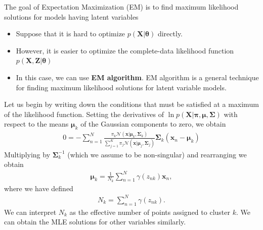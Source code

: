 The goal of Expectation Maximization (EM) is to find maximum likelihood solutions for models having latent variables 
\begin{itemize}
	\item Suppose that it is hard to optimize $p(\mathbf{X}|\boldsymbol{\theta})$ directly.
	\item However, it is easier to optimize the complete-data likelihood function $p(\mathbf{X}, \mathbf{Z}|\boldsymbol{\theta})$ 
	\item In this case, we can use \textbf{EM algorithm}. EM algorithm is a general technique for finding maximum likelihood solutions for latent variable models. 
\end{itemize}
Let us begin by writing down the conditions that must be satisfied at a maximum of the likelihood function. Setting the derivatives of $\ln p(\mathbf{X}|\boldsymbol{\pi},\boldsymbol{\mu},\boldsymbol{\Sigma})$  with respect to the means $\boldsymbol{\mu}_k$ of the Gaussian components to zero, we obtain
\begin{align*}
	0 = -\sum_{n=1}^N\frac{\pi_k\mathcal{N}(\mathbf{x}|\boldsymbol{\mu}_k, \boldsymbol{\Sigma}_k)}{\sum_{j=1}^{K} \pi_j\mathcal{N}(\mathbf{x}|\boldsymbol{\mu}_j, \boldsymbol{\Sigma}_j)}\boldsymbol{\Sigma}_k(\mathbf{x}_n-\boldsymbol{\mu}_k)
\end{align*}
Multiplying by $\boldsymbol{\Sigma}_k^{-1}$ (which we assume to be non-singular) and rearranging we obtain
\begin{align*}
	\boldsymbol{\mu}_k = \frac{1}{N_k}\sum_{n=1}^{N}\gamma(z_{nk})\mathbf{x}_n, 
\end{align*}
where we have defined
\begin{align*}
	N_k = \sum_{n=1}^{N}\gamma(z_{nk}).
\end{align*}
We can interpret $N_k$ as the effective number of points assigned to cluster $k$. We can obtain the MLE solutions for other variables similarly.
